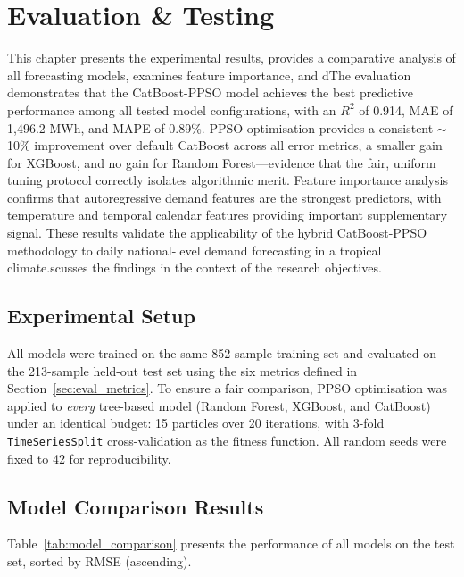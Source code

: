 \chapter{Evaluation \& Testing}\label{ch:Evaluation}

This chapter presents the experimental results, provides a comparative analysis of all forecasting models, examines feature importance, and dThe evaluation demonstrates that the CatBoost-PPSO model achieves the best predictive performance among all tested model configurations, with an $R^2$ of 0.914, MAE of 1{,}496.2 MWh, and MAPE of 0.89\%. PPSO optimisation provides a consistent $\sim$10\% improvement over default CatBoost across all error metrics, a smaller gain for XGBoost, and no gain for Random Forest---evidence that the fair, uniform tuning protocol correctly isolates algorithmic merit. Feature importance analysis confirms that autoregressive demand features are the strongest predictors, with temperature and temporal calendar features providing important supplementary signal. These results validate the applicability of the hybrid CatBoost-PPSO methodology to daily national-level demand forecasting in a tropical climate.scusses the findings in the context of the research objectives.


\section{Experimental Setup}

All models were trained on the same 852-sample training set and evaluated on the 213-sample held-out test set using the six metrics defined in Section~\ref{sec:eval_metrics}. To ensure a fair comparison, PPSO optimisation was applied to \emph{every} tree-based model (Random Forest, XGBoost, and CatBoost) under an identical budget: 15 particles over 20 iterations, with 3-fold \texttt{TimeSeriesSplit} cross-validation as the fitness function. All random seeds were fixed to 42 for reproducibility.


\section{Model Comparison Results}

Table~\ref{tab:model_comparison} presents the performance of all models on the test set, sorted by RMSE (ascending).

